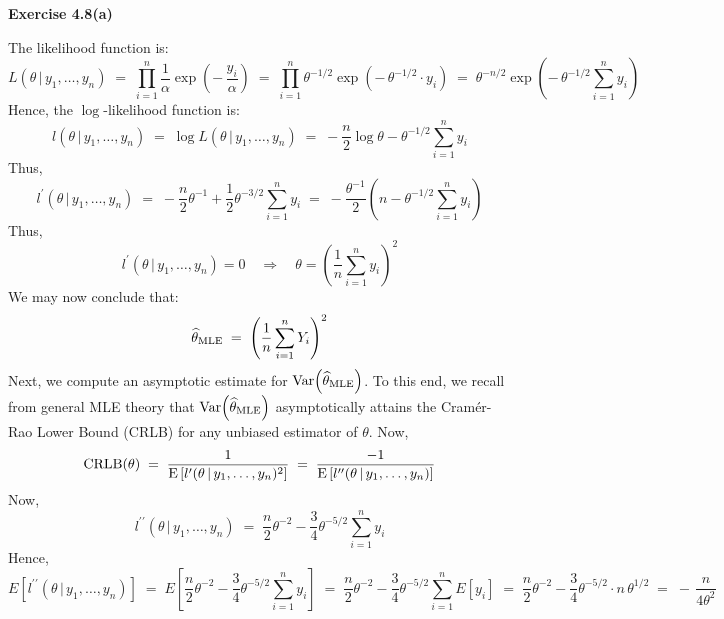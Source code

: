 
\noindent
\textbf{Exercise 4.8(a)}

\vskip 0.3cm
\noindent
The likelihood function is:
\begin{equation*}
L(\theta\,\vert\,y_{1},\ldots,y_{n})
\;=\;\prod_{i=1}^{n}\dfrac{1}{\alpha}\exp\left(-\,\dfrac{y_{i}}{\alpha}\right)
\;=\;\prod_{i=1}^{n}\theta^{-1/2}\exp\left(-\,\theta^{-1/2}\cdot y_{i}\right)
\;=\;\theta^{-n/2}\exp\left(-\,\theta^{-1/2}\sum_{i=1}^{n}y_{i}\right)
\end{equation*}
Hence, the $\log$-likelihood function is:
\begin{equation*}
l(\theta\,\vert\,y_{1},\ldots,y_{n})
\;=\; \log L(\theta\,\vert\,y_{1},\ldots,y_{n})
\;=\; -\dfrac{n}{2}\log\theta - \theta^{-1/2} \sum^{n}_{i=1} y_{i}
\end{equation*}
Thus,
\begin{equation*}
l^{\prime}(\theta\,\vert\,y_{1},\ldots,y_{n})
\;=\; -\dfrac{n}{2}\theta^{-1} + \dfrac{1}{2} \theta^{-3/2} \sum^{n}_{i=1} y_{i}
\;=\; -\dfrac{\theta^{-1}}{2}\left(n - \theta^{-1/2} \sum^{n}_{i=1} y_{i}\right)
\end{equation*}
Thus,
\begin{equation*}
l^{\prime}(\theta\,\vert\,y_{1},\ldots,y_{n}) = 0
\quad\Longrightarrow\quad
\theta =  \left(\dfrac{1}{n}\sum^{n}_{i=1} y_{i}\right)^{2}
\end{equation*}
We may now conclude that:
\begin{equation*}
\widehat{\theta}_{\textnormal{MLE}}
\;=\;\left(\dfrac{1}{n}\sum^{n}_{i=1}Y_{i}\right)^{2}
\end{equation*}
Next, we compute an asymptotic estimate for $\textnormal{Var}\!\left(\widehat{\theta}_{\textnormal{MLE}}\right)$.
To this end, we recall from general MLE theory that $\textnormal{Var}\!\left(\widehat{\theta}_{\textnormal{MLE}}\right)$
asymptotically attains the Cram\'er-Rao Lower Bound (CRLB) for any unbiased estimator of $\theta$.
Now,
\begin{equation*}
\textnormal{CRLB}(\theta)
\;=\; \dfrac{1}{\textnormal{E}\left[l^{\prime}(\theta\,\vert\,y_{1},\ldots,y_{n})^{2}\right]} 
\;=\; \dfrac{-1}{\textnormal{E}\left[l^{\prime\prime}(\theta\,\vert\,y_{1},\ldots,y_{n})\right]} 
\end{equation*}
Now,
\begin{equation*}
l^{\prime\prime}(\theta\,\vert\,y_{1},\ldots,y_{n})
\;=\; \dfrac{n}{2}\theta^{-2} - \dfrac{3}{4}\theta^{-5/2}\sum_{i=1}^{n}y_{i}
\end{equation*}
Hence,
\begin{equation*}
E\left[l^{\prime\prime}(\theta\,\vert\,y_{1},\ldots,y_{n})\right]
\;=\; E\left[\dfrac{n}{2}\theta^{-2} - \dfrac{3}{4}\theta^{-5/2}\sum_{i=1}^{n}y_{i}\right]
\;=\; \dfrac{n}{2}\theta^{-2} - \dfrac{3}{4}\theta^{-5/2}\sum_{i=1}^{n}E\left[y_{i}\right]
\;=\; \dfrac{n}{2}\theta^{-2} - \dfrac{3}{4}\theta^{-5/2}\cdot n\,\theta^{1/2}
\;=\; -\,\dfrac{n}{4\theta^{2}}
\end{equation*}
